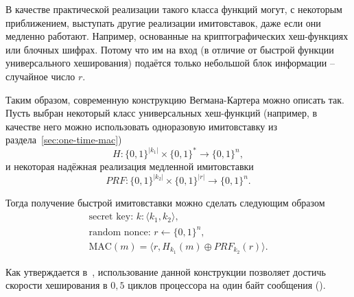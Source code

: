 В качестве практической реализации такого класса функций могут, с некоторым приближением, выступать другие реализации имитовставок, даже если они медленно работают. Например, основанные на криптографических хеш-функциях или блочных шифрах. Потому что им на вход (в отличие от быстрой функции универсального хеширования) подаётся только небольшой блок информации -- случайное число $r$.

Таким образом, современную конструкцию Вегмана-Картера можно описать так. Пусть выбран некоторый класс универсальных хеш-функций (например, в качестве него можно использовать одноразовую имитовставку из раздела~\ref{sec:one-time-mac}) \[
    H: \{0,1\}^{|k_1|} \times \{0,1\}^* \to \{0,1\}^n,
\] и некоторая надёжная реализация медленной имитовставки \[
    PRF: \{0,1\}^{|k_2|} \times \{0,1\}^{|r|} \to \{0,1\}^n.
\]

Тогда получение быстрой имитовставки можно сделать следующим образом
\[ \begin{array}{l}
\textrm{secret key: } k: \langle k_1, k_2 \rangle,\\
\textrm{random nonce: } r \leftarrow \{0,1\}^n,\\
\textrm{MAC} (m) = \langle r, H_{k_1}(m) \oplus PRF_{k_2}(r) \rangle.
\end{array} \]

Как утверждается в~\cite{Krovetz:2000}, использование данной конструкции позволяет достичь скорости хеширования в $0{,}5$ циклов процессора на один байт сообщения ().
